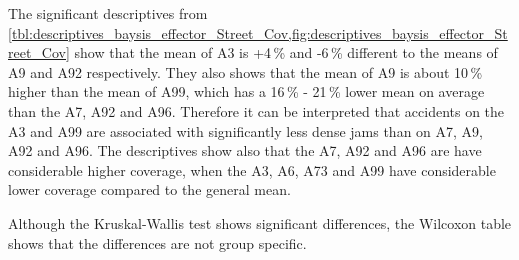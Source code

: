The significant descriptives from \cref{tbl:descriptives_baysis_effector_Street_Cov,fig:descriptives_baysis_effector_Street_Cov} show that the mean of A3 is +4\,\% and -6\,\% different to the means of A9 and A92 respectively. They also shows that the mean of A9 is about 10\,\% higher than the mean of A99, which has a 16\,\% - 21\,\% lower mean on average than the A7, A92 and A96. Therefore it can be interpreted that accidents on the A3 and A99 are associated with significantly less dense jams than on A7, A9, A92 and A96. The descriptives show also that the A7, A92 and A96 are have considerable higher coverage, when the A3, A6, A73 and A99 have considerable lower coverage compared to the general mean.






 

 Although the Kruskal-Wallis test shows significant differences, the Wilcoxon table shows that the differences are not group specific. 

